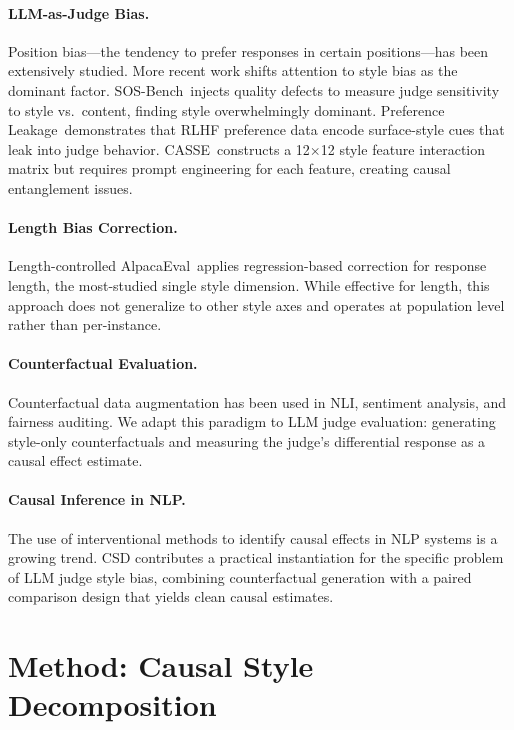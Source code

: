 \documentclass[11pt,a4paper]{article}
\begin{document}
\paragraph{LLM-as-Judge Bias.}
Position bias---the tendency to prefer responses in certain positions---has been extensively studied.
More recent work shifts attention to style bias as the dominant factor.
SOS-Bench~injects quality defects to measure judge sensitivity to style vs.\ content, finding style overwhelmingly dominant.
Preference Leakage~demonstrates that RLHF preference data encode surface-style cues that leak into judge behavior.
CASSE~constructs a 12$\times$12 style feature interaction matrix but requires prompt engineering for each feature, creating causal entanglement issues.

\paragraph{Length Bias Correction.}
Length-controlled AlpacaEval~applies regression-based correction for response length, the most-studied single style dimension.
While effective for length, this approach does not generalize to other style axes and operates at population level rather than per-instance.

\paragraph{Counterfactual Evaluation.}
Counterfactual data augmentation has been used in NLI, sentiment analysis, and fairness auditing.
We adapt this paradigm to LLM judge evaluation: generating style-only counterfactuals and measuring the judge's differential response as a causal effect estimate.

\paragraph{Causal Inference in NLP.}
The use of interventional methods to identify causal effects in NLP systems is a growing trend.
CSD contributes a practical instantiation for the specific problem of LLM judge style bias, combining counterfactual generation with a paired comparison design that yields clean causal estimates.

\section{Method: Causal Style Decomposition}
\end{document}
